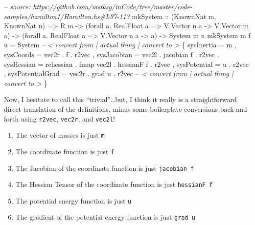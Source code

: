 \documentclass[]{article}
\newenvironment{Shaded}{}{}
\newcommand{\DataTypeTok}[1]{\textcolor[rgb]{0.56,0.13,0.00}{#1}}
\newcommand{\CommentTok}[1]{\textcolor[rgb]{0.38,0.63,0.69}{\textit{#1}}}
\newcommand{\OtherTok}[1]{\textcolor[rgb]{0.00,0.44,0.13}{#1}}
\newcommand{\FunctionTok}[1]{\textcolor[rgb]{0.02,0.16,0.49}{#1}}
\newcommand{\NormalTok}[1]{#1}
\begin{document}
\begin{Shaded}
\begin{Highlighting}[]
\CommentTok{-- source: https://github.com/mstksg/inCode/tree/master/code-samples/hamilton1/Hamilton.hs#L97-113}
\NormalTok{mkSystem}
\OtherTok{    ::}\NormalTok{ (}\DataTypeTok{KnownNat}\NormalTok{ m, }\DataTypeTok{KnownNat}\NormalTok{ n)}
    \OtherTok{=>} \DataTypeTok{R}\NormalTok{ m}
    \OtherTok{->}\NormalTok{ (forall a}\FunctionTok{.} \DataTypeTok{RealFloat}\NormalTok{ a }\OtherTok{=>} \DataTypeTok{V.Vector}\NormalTok{ n a }\OtherTok{->} \DataTypeTok{V.Vector}\NormalTok{ m a)}
    \OtherTok{->}\NormalTok{ (forall a}\FunctionTok{.} \DataTypeTok{RealFloat}\NormalTok{ a }\OtherTok{=>} \DataTypeTok{V.Vector}\NormalTok{ n a }\OtherTok{->}\NormalTok{ a)}
    \OtherTok{->} \DataTypeTok{System}\NormalTok{ m n}
\NormalTok{mkSystem m f u }\FunctionTok{=} \DataTypeTok{System}
                  \CommentTok{-- < convert from | actual thing | convert to >}
\NormalTok{    \{ sysInertia       }\FunctionTok{=}\NormalTok{                         m}
\NormalTok{    , sysCoords        }\FunctionTok{=}\NormalTok{      vec2r }\FunctionTok{.}\NormalTok{            f }\FunctionTok{.}\NormalTok{ r2vec}
\NormalTok{    , sysJacobian      }\FunctionTok{=}\NormalTok{      vec2l }\FunctionTok{.}\NormalTok{   jacobian f }\FunctionTok{.}\NormalTok{ r2vec}
\NormalTok{    , sysHessian       }\FunctionTok{=}\NormalTok{ rehessian}
                       \FunctionTok{.}\NormalTok{ fmap vec2l }\FunctionTok{.}\NormalTok{   hessianF f }\FunctionTok{.}\NormalTok{ r2vec}
\NormalTok{    , sysPotential     }\FunctionTok{=}\NormalTok{                         u }\FunctionTok{.}\NormalTok{ r2vec}
\NormalTok{    , sysPotentialGrad }\FunctionTok{=}\NormalTok{      vec2r }\FunctionTok{.}\NormalTok{       grad u }\FunctionTok{.}\NormalTok{ r2vec}
                  \CommentTok{-- < convert from | actual thing | convert to >}
\NormalTok{    \}}
\end{Highlighting}
\end{Shaded}

Now, I hesitate to call this ``trivial''\ldots{}but, I think it really is a
straightforward direct translation of the definitions, minus some boilerplate
conversions back and forth using \texttt{r2vec}, \texttt{vec2r}, and
\texttt{vec2l}!

\begin{enumerate}
\def\labelenumi{\arabic{enumi}.}
\tightlist
\item
  The vector of masses is just \texttt{m}
\item
  The coordinate function is just \texttt{f}
\item
  The Jacobian of the coordinate function is just \texttt{jacobian\ f}
\item
  The Hessian Tensor of the coordinate function is just \texttt{hessianF\ f}
\item
  The potential energy function is just \texttt{u}
\item
  The gradient of the potential energy function is just \texttt{grad\ u}
\end{enumerate}
\end{document}
